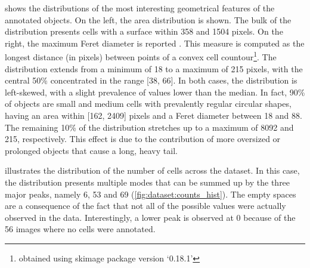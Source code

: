  shows the distributions of the most interesting geometrical features of the annotated objects.
On the left, the area distribution is shown. 
The bulk of the distribution presents cells with a surface within 358 and 1504 pixels.
On the right, the maximum Feret diameter is reported \cite{merkus2009particle}. This measure is computed as the longest distance (in pixels) between points of a convex cell countour\footnote{obtained using skimage package version `0.18.1'}.
The distribution extends from a minimum of 18 to a maximum of 215 pixels, with the central 50\% concentrated in the range [38, 66].
In both cases, the distribution is left-skewed, with a slight prevalence of values lower than the median.
In fact, 90\% of objects are small and medium cells with prevalently regular circular shapes, having an area within [162, 2409] pixels and a Feret diameter between 18 and 88.
The remaining 10\% of the distribution stretches up to a maximum of 8092 and 215, respectively.
This effect is due to the contribution of more oversized or prolonged objects that cause a long, heavy tail.

 illustrates the distribution of the number of cells across the dataset.
In this case, the distribution presents multiple modes that can be summed up by the three major peaks, namely 6, 53 and 69
(\cref{fig:dataset:counts_hist}).
The empty spaces are a consequence of the fact that not all of the possible values were actually observed in the data.
Interestingly, a lower peak is observed at 0 because of the 56 images where no cells were annotated.

